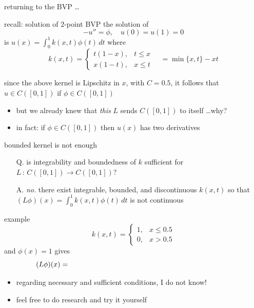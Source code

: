 \documentclass[10pt,
               svgnames,
               hyperref={colorlinks,
                         citecolor=DeepPink4,
                         linkcolor=FireBrick,
                         urlcolor=Maroon},
               usepdftitle=false]{beamer}
\newcommand{\ds}{\displaystyle}
\begin{document}
\begin{frame}{returning to the BVP \dots}

\begin{block}{recall: solution of 2-point BVP}
the solution of
    $$-u'' = \phi, \quad u(0) = u(1) = 0$$
is \quad $\ds u(x) = \int_0^1 k(x,t) \phi(t)\,dt$ \quad where
    $$k(x,t) = \begin{cases} t (1 - x), & t \le x \\ x (1 - t), & x \le t\end{cases} \quad = \min\{x,t\} - xt$$
\end{block}

\begin{corollary}
since the above kernel is Lipschitz in $x$, with $C=0.5$, it follows that $u \in C([0,1])$ if $\phi\in C([0,1])$
\end{corollary}

\begin{itemize}
\item but we already knew that \emph{this} $L$ sends $C([0,1])$ to itself \dots why?
\item in fact: if $\phi\in C([0,1])$ then $u(x)$ has two derivatives
\end{itemize}
\end{frame}


\begin{frame}{bounded kernel is not enough}

\begin{itemize}
\item[Q.] is integrability and boundedness of $k$ sufficient for $L\,:\,C([0,1])\to C([0,1])$?
\item[A.] \emph{no.}  there exist integrable, bounded, and discontinuous $k(x,t)$ so that $(L\phi)(x) = \int_0^1 k(x,t) \phi(t)\,dt$ is not continuous
\end{itemize}


\begin{block}{example}
  $$k(x,t)=\begin{cases} 1, & x\le 0.5 \\ 0, & x>0.5\end{cases}$$
and $\phi(x)=1$ gives
	$$(L\phi)(x) = \hspace{80mm}$$

\vspace{10mm}
\end{block}
\begin{itemize}
\item regarding necessary and sufficient conditions, I do not know!
\item feel free to do research and try it yourself
\end{itemize}
\end{frame}
\end{document}
